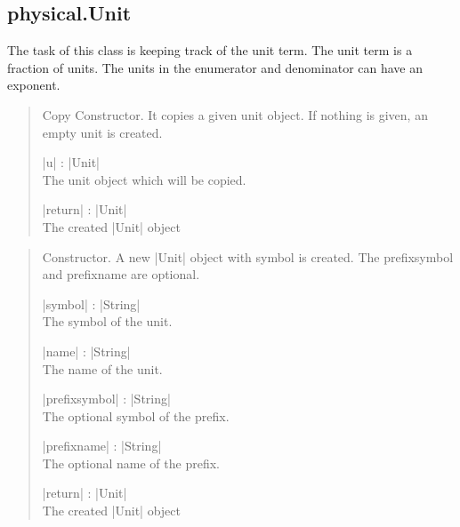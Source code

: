 \documentclass{ltxdoc}
\begin{document}
%
%
\subsection{physical.Unit}

The task of this class is keeping track of the unit term. The unit term is a fraction of units. The units in the enumerator and denominator can have an exponent. 


\begin{quote}
  Copy Constructor. It copies a given unit object. If nothing is given, an empty unit is created.

  \subtitle{Parameters}
  \begin{description}
  \item |u| : |Unit|\\
    The unit object which will be copied.

  \item |return| : |Unit|\\
    The created |Unit| object
  \end{description}

\end{quote}


\begin{quote}
  Constructor. A new |Unit| object with symbol is created. The prefixsymbol and prefixname are optional. 

  \subtitle{Parameters}
  \begin{description}
  \item |symbol| : |String|\\
    The symbol of the unit.

  \item |name| : |String|\\
    The name of the unit.

  \item |prefixsymbol| : |String|\\
    The optional symbol of the prefix. 

  \item |prefixname| : |String|\\
    The optional name of the prefix. 

  \item |return| : |Unit|\\
    The created |Unit| object
  \end{description}

\end{quote}
\end{document}
